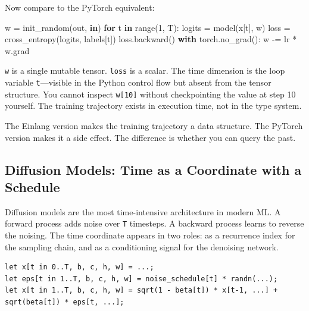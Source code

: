 \documentclass[11pt,titlepage]{article}
\newenvironment{Shaded}{}{}
\newcommand{\BuiltInTok}[1]{#1}
\newcommand{\ControlFlowTok}[1]{\textcolor[rgb]{0.00,0.44,0.13}{\textbf{#1}}}
\newcommand{\DecValTok}[1]{\textcolor[rgb]{0.25,0.63,0.44}{#1}}
\newcommand{\KeywordTok}[1]{\textcolor[rgb]{0.00,0.44,0.13}{\textbf{#1}}}
\newcommand{\NormalTok}[1]{#1}
\newcommand{\OperatorTok}[1]{\textcolor[rgb]{0.40,0.40,0.40}{#1}}
\begin{document}
Now compare to the PyTorch equivalent:

\begin{Shaded}
\begin{Highlighting}[]
\NormalTok{w }\OperatorTok{=}\NormalTok{ init_random(out, }\KeywordTok{in}\NormalTok{)}
\ControlFlowTok{for}\NormalTok{ t }\KeywordTok{in} \BuiltInTok{range}\NormalTok{(}\DecValTok{1}\NormalTok{, T):}
\NormalTok{    logits }\OperatorTok{=}\NormalTok{ model(x[t], w)}
\NormalTok{    loss }\OperatorTok{=}\NormalTok{ cross_entropy(logits, labels[t])}
\NormalTok{    loss.backward()}
    \ControlFlowTok{with}\NormalTok{ torch.no_grad():}
\NormalTok{        w }\OperatorTok{-=}\NormalTok{ lr }\OperatorTok{*}\NormalTok{ w.grad}
\end{Highlighting}
\end{Shaded}

\texttt{w} is a single mutable tensor. \texttt{loss} is a scalar. The
time dimension is the loop variable \texttt{t}---visible in the Python
control flow but absent from the tensor structure. You cannot inspect
\texttt{w{[}10{]}} without checkpointing the value at step 10 yourself.
The training trajectory exists in execution time, not in the type
system.

The Einlang version makes the training trajectory a data structure. The
PyTorch version makes it a side effect. The difference is whether you
can query the past.

\vspace{2em}

\hypertarget{diffusion-models-time-as-a-coordinate-with-a-schedule}{%
\subsection{Diffusion Models: Time as a Coordinate with a
Schedule}\label{diffusion-models-time-as-a-coordinate-with-a-schedule}}

Diffusion models are the most time-intensive architecture in modern ML.
A forward process adds noise over \texttt{T} timesteps. A backward
process learns to reverse the noising. The time coordinate appears in
two roles: as a recurrence index for the sampling chain, and as a
conditioning signal for the denoising network.

\begin{verbatim}
let x[t in 0..T, b, c, h, w] = ...;
let eps[t in 1..T, b, c, h, w] = noise_schedule[t] * randn(...);
let x[t in 1..T, b, c, h, w] = sqrt(1 - beta[t]) * x[t-1, ...] + sqrt(beta[t]) * eps[t, ...];
\end{verbatim}
\end{document}
